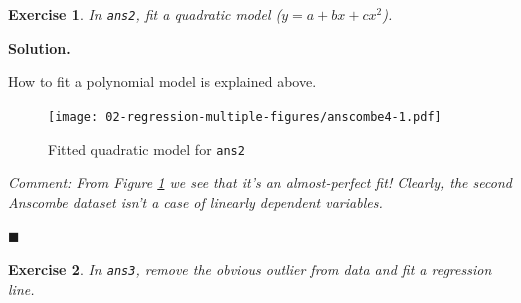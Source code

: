 \documentclass[10pt,b5paper,krantz1]{krantz}
\newenvironment{Shaded}{\begin{snugshade}}{\end{snugshade}}
\newcommand{\DataTypeTok}[1]{\textcolor[rgb]{0.27,0.27,0.27}{#1}}
\newcommand{\DecValTok}[1]{\textcolor[rgb]{0.06,0.06,0.06}{#1}}
\newcommand{\FloatTok}[1]{\textcolor[rgb]{0.06,0.06,0.06}{#1}}
\newcommand{\KeywordTok}[1]{\textcolor[rgb]{0.27,0.27,0.27}{\textbf{#1}}}
\newcommand{\NormalTok}[1]{#1}
\newcommand{\OperatorTok}[1]{\textcolor[rgb]{0.43,0.43,0.43}{\textbf{#1}}}
\newcommand{\StringTok}[1]{\textcolor[rgb]{0.5,0.5,0.5}{#1}}
\newtheorem{exercise}{Exercise}[chapter]
\newenvironment{solution}{%
\bigskip\noindent\textbf{Solution. }%
\it\ignorespaces%
\ignorespaces%
}{\ignorespaces%
\hfill$\blacksquare$%
}
\begin{document}
\begin{exercise}

In \texttt{ans2}, fit a quadratic model (\(y=a + bx + cx^2\)).

\end{exercise}

\begin{solution}

How to fit a polynomial model is explained above.

\begin{Shaded}
\end{Shaded}

\begin{figure}
\hypertarget{fig:anscombe4}{%
\centering
\texttt{[image: 02-regression-multiple-figures/anscombe4-1.pdf]}
\caption{Fitted quadratic model for \texttt{ans2}}\label{fig:anscombe4}
}
\end{figure}

\emph{Comment: From Figure \ref{fig:anscombe4} we see that it's
an almost-perfect fit! Clearly,
the second Anscombe dataset isn't a case of linearly
dependent variables.}

\end{solution}

\begin{exercise}

In \texttt{ans3}, remove the obvious outlier from data
and fit a regression line.

\end{exercise}
\end{document}

